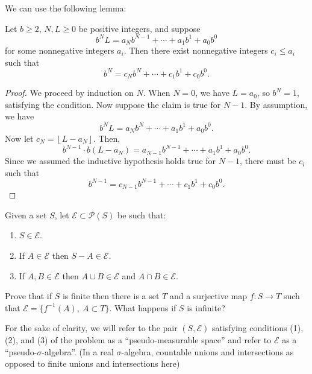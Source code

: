 \documentclass[11pt,letterpaper]{article}
\begin{document}
We can use the following lemma:

\begin{claim}
    Let $b \geq 2$, $N, L \geq 0$ be positive integers, and suppose
    \[ b^{N}L = a_{N}b^{N-1}+\cdots+a_{1}b^1+a_{0}b^0\]
    for some nonnegative integers $a_i$. Then there exist nonnegative integers $c_i \leq a_i$ such that 
    \[ b^{N} = c_{N}b^{N}+\cdots+c_1b^1+c_0b^0.\]
\end{claim}
\begin{proof}
    We proceed by induction on $N$. When $N = 0$, we have $L=a_0$, so $b^{N}=1$, satisfying the condition. Now suppose the claim is true for $N-1$. By assumption, we have 
    \[ b^{N}L = a_{N}b^{N}+\cdots+a_1b^1+a_0b^0. \]
    Now let $c_{N}=\left\lfloor L-a_{N} \right\rfloor$. Then,
    \[ b^{N-1}\cdot b(L-a_{N}) = a_{N-1}b^{N-1}+\cdots+a_1b^1+a_0b^0.\]
    Since we assumed the inductive hypothesis holds true for $N-1$, there must be $c_i$ such that
    \[b^{N-1}=c_{N-1}b^{N-1}+\cdots+c_1b^1+c_0b^0.\]
    
\end{proof}

\pagebreak
\begin{problem}
    Given a set $S$, let $\mathcal{E}\subset \mathcal{P}(S)$ be such that:
    \begin{enumerate}
        \item $S\in \mathcal{E}$.
        \item If $A\in \mathcal{E}$ then $S-A\in \mathcal{E}$.
        \item If $A,B\in \mathcal{E}$ then $A\cup B\in \mathcal{E}$ and $A\cap B\in \mathcal{E}$.
    \end{enumerate}

    Prove that if $S$ is finite then there is a set $T$ and a surjective map $f:S\to T$ such that $\mathcal{E}=\{f^{-1}(A),\ A\subset T\}$. What happens if $S$ is infinite?
\end{problem}

For the sake of clarity, we will refer to the pair $(S, \mathcal{E})$ satisfying conditions (1), (2), and (3) of the problem as a ``pseudo-measurable space'' and refer to $\mathcal{E}$ as a  ``pseudo-$\sigma$-algebra''. (In a real $\sigma$-algebra, countable unions and intersections as opposed to finite unions and intersections here)
\end{document}
